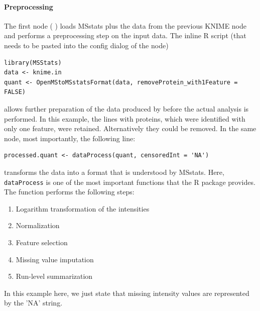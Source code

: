 \paragraph{Preprocessing} \mbox{}\newline
\noindent The first node ( ) loads MSstats plus the data from the previous KNIME node and performs a preprocessing step on the input data. The inline R script (that needs to be pasted into the config dialog of the node)
\begin{lstlisting}
library(MSStats)
data <- knime.in
quant <- OpenMStoMSstatsFormat(data, removeProtein_with1Feature = FALSE)
\end{lstlisting}
allows further preparation of the data produced by  before the actual analysis is performed. In this example, the 
lines with proteins, which were identified with only one feature, were retained. Alternatively they could be removed.
\newline
\noindent In the same node, most importantly, the following line:
\begin{lstlisting}
processed.quant <- dataProcess(quant, censoredInt = 'NA')
\end{lstlisting}
transforms the data into a format that is understood by MSstats.
Here, \texttt{dataProcess} is one of the most important functions that the
R package provides. The function performs the following steps:
\begin{enumerate}
	\item
	Logarithm transformation of the intensities
	\item
	Normalization
	\item
	Feature selection
	\item
	Missing value imputation
	\item
	Run-level summarization
\end{enumerate}
In this example here, we just state that missing intensity values are represented by the 'NA' string. 


